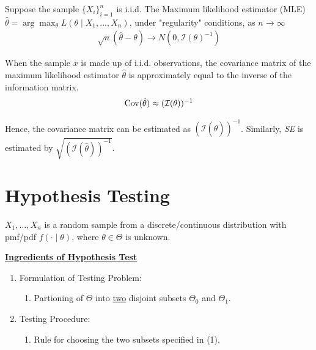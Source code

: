 \documentclass[11pt]{elegantbook}
\begin{document}
\begin{theorem}
    Suppose the sample $\{X_i\}_{i=1}^n$ is i.i.d. The Maximum likelihood estimator (MLE) $\hat{\theta}=\arg\max_\theta L(\theta\mid X_1,...,X_n)$, under "regularity" conditions, as $n \rightarrow \infty$
    \begin{equation}
        \begin{aligned}
            \sqrt{n}\left(\hat{\theta}-\theta\right) \rightarrow N(0,\mathcal{I}(\theta)^{-1})
        \end{aligned}
        \nonumber
    \end{equation}
\end{theorem}
\begin{proposition}
    When the sample $x$ is made up of i.i.d. observations, the covariance matrix of the maximum likelihood estimator $\hat{\theta}$ is approximately equal to the inverse of the information matrix. $$\textnormal{Cov}(\hat{\theta})\approx(\mathcal{I}(\theta))^{-1}$$
\end{proposition}
Hence, the covariance matrix can be estimated as $(\mathcal{I}(\hat{\theta}))^{-1}$. Similarly, \textit{SE} is estimated by $\sqrt{(\mathcal{I}(\hat{\theta}))^{-1}}$.


\section{Hypothesis Testing}
$X_1,...,X_n$ is a random sample from a discrete/continuous distribution with pmf/pdf $f(\cdot\mid \theta)$, where $\theta\in\Theta$ is unknown.

\textbf{\underline{Ingredients of Hypothesis Test}}
\begin{enumerate}[(1).]
    \item Formulation of Testing Problem:
    \begin{enumerate}[$\circ$]
        \item Partioning of $\Theta$ into \underline{two} disjoint subsets $\Theta_0$ and $\Theta_1$.
    \end{enumerate}
    \item Testing Procedure:
    \begin{enumerate}[$\circ$]
        \item Rule for choosing the two subsets specified in (1).
    \end{enumerate}
\end{enumerate}
\end{document}
